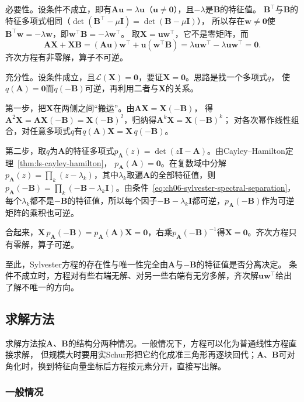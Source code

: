必要性。设条件不成立，即有$\bm A\bm u=\lambda\bm u$（$\bm u\neq\bm0$），且$-\lambda$是$\bm B$的特征值。
$\bm B^\top$与$\bm B$的特征多项式相同（$\det(\bm B^\top-\mu\bm I)=\det(\bm B-\mu\bm I)$），
所以存在$\bm w\neq\bm0$使$\bm B^\top\bm w=-\lambda\bm w$，即$\bm w^\top\bm B=-\lambda\bm w^\top$。
取$\bm X=\bm u\bm w^\top$，它不是零矩阵，而
\[
 \bm A\bm X+\bm X\bm B=(\bm A\bm u)\bm w^\top+\bm u(\bm w^\top\bm B)
 =\lambda\bm u\bm w^\top-\lambda\bm u\bm w^\top=\bm0 .
\]
齐次方程有非零解，算子不可逆。

充分性。设条件成立，且$\mathcal L(\bm X)=\bm0$，要证$\bm X=\bm0$。思路是找一个多项式$q$，
使$q(\bm A)=\bm0$而$q(-\bm B)$可逆，再利用二者与$\bm X$的关系。

第一步，把$\bm X$在两侧之间“搬运”。由$\bm A\bm X=\bm X(-\bm B)$，
得$\bm A^2\bm X=\bm A\bm X(-\bm B)=\bm X(-\bm B)^2$，归纳得$\bm A^k\bm X=\bm X(-\bm B)^k$；
对各次幂作线性组合，对任意多项式$q$有$q(\bm A)\bm X=\bm X\,q(-\bm B)$。

第二步，取$q$为$\bm A$的特征多项式$p_{\bm A}(z)=\det(z\bm I-\bm A)$。由Cayley--Hamilton定理~\ref{thm:ls-cayley-hamilton}，
$p_{\bm A}(\bm A)=\bm0$。在复数域中分解$p_{\bm A}(z)=\prod_k(z-\lambda_k)$，其中$\lambda_k$取遍$\bm A$的全部特征值，则
$p_{\bm A}(-\bm B)=\prod_k(-\bm B-\lambda_k\bm I)$。由条件~\eqref{eq:ch06-sylvester-spectral-separation}，
每个$\lambda_k$都不是$-\bm B$的特征值，所以每个因子$-\bm B-\lambda_k\bm I$都可逆，$p_{\bm A}(-\bm B)$作为可逆矩阵的乘积也可逆。

合起来，$\bm X\,p_{\bm A}(-\bm B)=p_{\bm A}(\bm A)\bm X=\bm0$，右乘$p_{\bm A}(-\bm B)^{-1}$得$\bm X=\bm0$。齐次方程只有零解，算子可逆。

至此，Sylvester方程的存在性与唯一性完全由$\bm A$与$-\bm B$的特征值是否分离决定。
条件不成立时，方程对有些右端无解、对另一些右端有无穷多解，齐次解$\bm u\bm w^\top$给出了解不唯一的方向。

\subsection{求解方法}
\label{sec:ls-matrix-equation-solve}

求解方法按$\bm A$、$\bm B$的结构分两种情况。一般情况下，方程可以化为普通线性方程直接求解，
但规模大时要用实Schur形把它约化成准三角形再逐块回代；$\bm A$、$\bm B$可对角化时，换到特征向量坐标后方程按元素分开，直接写出解。

\subsubsection{一般情况}
\label{sec:ls-one-sided-two-sided}

